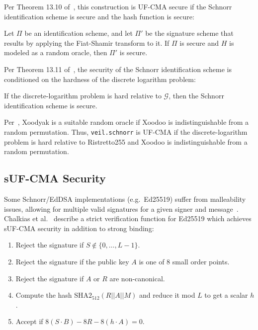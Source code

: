 Per Theorem 13.10 of~\cite[p. 478]{katz2020}, this construction is UF-CMA secure if the Schnorr identification scheme
is secure and the hash function is secure:

\begin{displayquote}
    Let $\Pi$ be an identification scheme, and let $\Pi'$ be the signature scheme that results by applying the
    Fiat-Shamir transform to it.
    If $\Pi$ is secure and $H$ is modeled as a random oracle, then $\Pi'$ is secure.
\end{displayquote}

Per Theorem 13.11 of~\cite[p. 481]{katz2020}, the security of the Schnorr identification scheme is conditioned on the
hardness of the discrete logarithm problem:

\begin{displayquote}
    If the discrete-logarithm problem is hard relative to $\mathcal{G}$, then the Schnorr identification scheme is
    secure.
\end{displayquote}

Per~\cite[Sec. 5.10]{bertoni2011sponge}, Xoodyak is a suitable random oracle if Xoodoo is indistinguishable from a
random permutation.
Thus, \texttt{veil.schnorr} is UF-CMA if the discrete-logarithm problem is hard relative to Ristretto255 and
Xoodoo is indistinguishable from a random permutation.

\subsection{sUF-CMA Security}\label{subsec:veil.schnorr-suf-cma}

Some Schnorr/EdDSA implementations (e.g.\ Ed25519) suffer from malleability issues, allowing for multiple valid
signatures for a given signer and message~\cite{brendel2021}.
Chalkias et al.~\cite{chalkias2020} describe a strict verification function for Ed25519 which achieves sUF-CMA security
in addition to strong binding:

\begin{displayquote}
    \begin{enumerate}
        \item Reject the signature if $S \not\in \{0,\ldots,L-1\}$.
        \item Reject the signature if the public key $A$ is one of 8 small order points.
        \item Reject the signature if $A$ or $R$ are non-canonical.
        \item Compute the hash $\text{SHA2}_{512}(R||A||M)$ and reduce it mod $L$ to get a scalar $h$.
        \item Accept if $8(S \cdot B)-8R-8(h \cdot A)=0$.
    \end{enumerate}
\end{displayquote}

